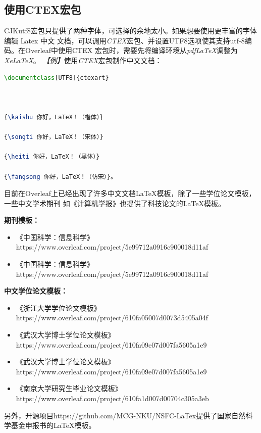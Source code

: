 \subsection{使用CTEX宏包}
CJKutf8宏包只提供了两种字体，可选择的余地太小。如果想要使用更丰富的字体编辑 Latex 中文
文档，可以调用\emph{CTEX}宏包、并设置UTF8选项使其支持utf-8编码。在Overleaf中使用CTEX
宏包时，需要先将编译环境从\emph{pdfLaTeX}调整为\emph{XeLaTeX}。
\emph{【例】}使用\emph{CTEX}宏包制作中文文档：
\begin{lstlisting}[language=TeX, caption={CTEX示例}]
\documentclass[UTF8]{ctexart}



{\kaishu 你好，LaTeX！（楷体）}

{\songti 你好，LaTeX！（宋体）}

{\heiti 你好，LaTeX！（黑体）}

{\fangsong 你好，LaTeX！（仿宋）}。


\end{lstlisting}

目前在Overleaf上已经出现了许多中文文档LaTeX模板，除了一些学位论文模板，一些中文学术期刊
如《计算机学报》也提供了科技论文的LaTeX模板。

\textbf{期刊模板：}
\begin{itemize}
      \item 《中国科学：信息科学》https://www.overleaf.com/project/5e99712a0916c900018d11af
      \item 《中国科学：信息科学》https://www.overleaf.com/project/5e99712a0916c900018d11af
\end{itemize}

\textbf{中文学位论文模板：}
\begin{itemize}
      \item 《浙江大学学位论文模板》https://www.overleaf.com/project/610fa05007d0073d5405a04f
      \item 《武汉大学博士学位论文模板》https://www.overleaf.com/project/610fa09e07d007fa5605a1e9
      \item 《武汉大学博士学位论文模板》https://www.overleaf.com/project/610fa09e07d007fa5605a1e9
      \item 《南京大学研究生毕业论文模板》https://www.overleaf.com/project/610fa1d007d00704c305a3eb
\end{itemize}

另外，开源项目https://github.com/MCG-NKU/NSFC-LaTex提供了国家自然科学基金申报书的LaTeX模板。